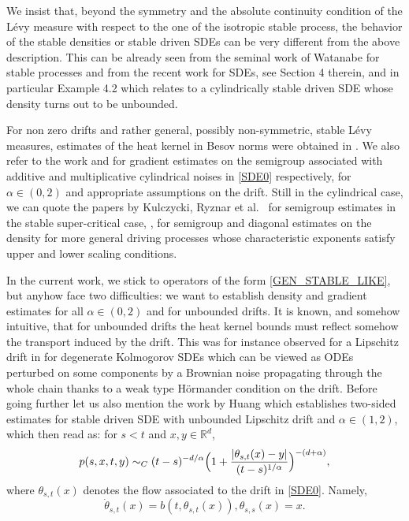 \documentclass[11pt]{article}
\numberwithin{equation}{section}\providecommand{\asymp}{\mathrel{\sim}}
\theoremstyle{plain}
\theoremstyle{definition}
\newcommand\mR{\mathbb{R}}
\newcommand\1{{\mathbf{1}}}
\begin{document}
{We insist that, beyond the symmetry and the absolute continuity condition of the Lévy measure with respect to the one of the isotropic stable process, the behavior of the stable densities or stable driven SDEs can be very different from the above description. This can be 	already seen from the seminal work of Watanabe \cite{wata:07} for stable processes and from the recent work \cite{knop:kuli:schi:20} for SDEs, see Section 4 therein, and in particular Example 4.2 which relates to a cylindrically stable driven SDE whose density turns out to be unbounded.
}

{
For non zero drifts and rather general, possibly non-symmetric, stable Lévy measures, estimates of the heat kernel in Besov norms were obtained in \cite{De-Fo}.
We also refer to the work \cite{kuli:pesz:prio:20} and \cite{CHZ} for gradient estimates on the semigroup associated
with additive and multiplicative cylindrical noises in \eqref{SDE0} respectively, for $\alpha\in (0,2) $ and appropriate assumptions on the drift. Still in the cylindrical case, we can quote the papers by Kulczycki, Ryznar et al.\ \cite{kulc:ryzn:szto:21} for semigroup estimates in the stable super-critical case, \cite{kulc:ryzn:19}, \cite{kulc:kuli:ryzn:21} for semigroup and diagonal estimates on the density for more general driving processes whose characteristic exponents satisfy upper and lower scaling conditions.
}

In the current work, {we stick to operators of the form \eqref{GEN_STABLE_LIKE}, but anyhow face two difficulties:} we want to establish {density and} gradient estimates for all $\alpha\in (0,2) $ and for unbounded drifts. It is known, and somehow intuitive, that for unbounded drifts the heat kernel bounds must reflect somehow the transport induced by the drift. This was for instance observed for a Lipschitz drift in \cite{dela:meno:10} for degenerate Kolmogorov SDEs which can be viewed as ODEs perturbed on some components by a Brownian noise propagating through the whole chain thanks to a weak type Hörmander condition on the drift.
Before going further let us also mention the work by Huang \cite{huan:15}
which establishes two-sided estimates for stable driven SDE with unbounded Lipschitz drift and $\alpha\in(1,2)$,
which then read as: for $s<t$ and $x,y\in\mR^d$,
\begin{equation}
\label{SECOND_TW}
p(s,x,t,y)\asymp_C (t-s)^{-d/\alpha} \Bigl(1+\frac{|\theta_{s,t}(x)-y|}{(t-s)^{1/\alpha}}\Bigr)^{-(d+\alpha)},
\end{equation}
where $\theta_{s,t}(x) $ denotes the flow associated to the drift in \eqref{SDE0}. Namely,
\[
\dot \theta_{s,t}(x)=b(t,\theta_{s,t}(x)), \theta_{s,s}(x)=x.
\]
\end{document}
